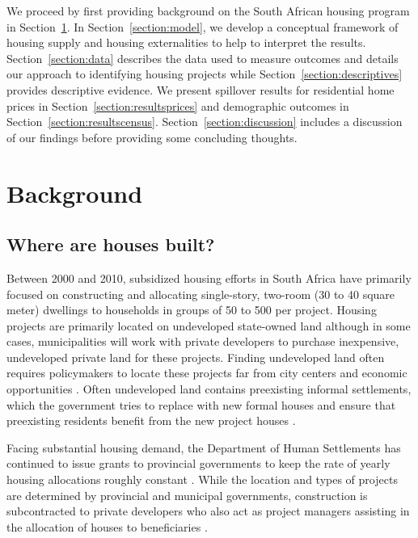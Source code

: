 \documentclass[12pt]{article}
\begin{document}
We proceed by first providing background on the South African housing program in Section~\ref{section:background}.  In Section~\ref{section:model}, we develop a conceptual framework of housing supply and housing externalities to help to interpret the results. Section~\ref{section:data} describes the data used to measure outcomes and details our approach to identifying housing projects while Section~\ref{section:descriptives} provides descriptive evidence.  We present spillover results for residential home prices in Section~\ref{section:resultsprices} and demographic outcomes in Section~\ref{section:resultscensus}.  Section~\ref{section:discussion} includes a discussion of our findings before providing some concluding thoughts.


\section{Background} \label{section:background}

\subsection{Where are houses built?}

Between 2000 and 2010, subsidized housing efforts in South Africa have primarily focused on constructing and allocating single-story, two-room (30 to 40 square meter) dwellings to households in groups of 50 to 500 per project.  Housing projects are primarily located on undeveloped state-owned land although in some cases, municipalities will work with private developers to purchase inexpensive, undeveloped private land for these projects.  Finding undeveloped land often requires policymakers to locate these projects far from city centers and economic opportunities \citep{dhsreports}.  Often undeveloped land contains preexisting informal settlements, which the government tries to replace with new formal houses and ensure that preexisting residents benefit from the new project houses \citep{serihistory}.

Facing substantial housing demand, the Department of Human Settlements has continued to issue grants to provincial governments to keep the rate of yearly housing allocations roughly constant \citep{dhsreports}.  While the location and types of projects are determined by provincial and municipal governments, construction is subcontracted to private developers who also act as project managers assisting in the allocation of houses to beneficiaries \citep{seriq}.
\end{document}
